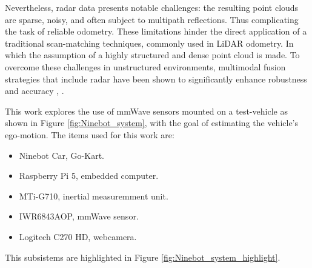 Nevertheless, radar data presents notable challenges: the resulting point clouds are sparse, noisy, and often subject to multipath reflections. 
Thus complicating the task of reliable odometry.  
These limitations hinder the direct application of a traditional scan-matching techniques, commonly used in LiDAR odometry. In which the assumption of a highly structured and dense point cloud is made.
To overcome these challenges in unstructured environments, multimodal fusion strategies that include radar have been shown to significantly enhance robustness and accuracy \cite{Multimodal_Offroad}, \cite{HighSpeed_Estimation}.

This work explores the use of mmWave sensors mounted on a test-vehicle as shown in Figure \ref{fig:Ninebot_system}, with the goal of estimating the vehicle's ego-motion.
The items used for this work are:
\begin{itemize}
    \item Ninebot Car, Go-Kart.
    \item Raspberry Pi 5, embedded computer.
    \item MTi-G710, inertial measuremment unit.
    \item IWR6843AOP, mmWave sensor.
    \item Logitech C270 HD, webcamera.
\end{itemize}

This subsistems are highlighted in Figure \ref{fig:Ninebot_system_highlight}.

